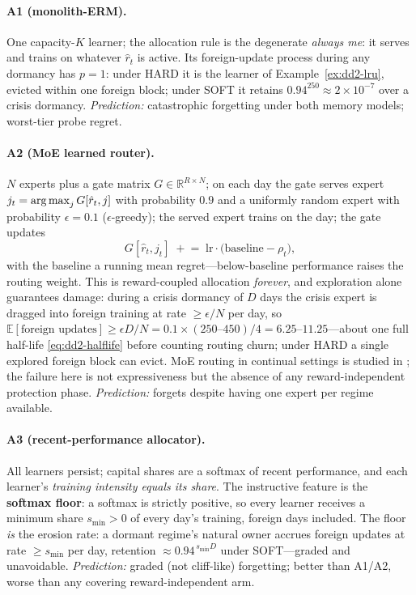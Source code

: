 \documentclass[11pt,a4paper]{article}
\theoremstyle{definition}
\theoremstyle{plain}
\newcommand{\R}{\mathbb{R}}
\newcommand{\E}{\mathbb{E}}
\newcommand{\argmax}{\operatornamewithlimits{arg\,max}}
\begin{document}
\paragraph{A1 (monolith-ERM).} One capacity-$K$ learner; the allocation rule
is the degenerate \emph{always me}: it serves and trains on whatever
$\hat r_t$ is active. Its foreign-update process during any dormancy has
$p = 1$: under HARD it is the learner of Example~\ref{ex:dd2-lru}, evicted
within one foreign block; under SOFT it retains
$0.94^{250} \approx 2 \times 10^{-7}$ over a crisis dormancy.
\emph{Prediction:} catastrophic forgetting under both memory models;
worst-tier probe regret.

\paragraph{A2 (MoE learned router).} $N$ experts plus a gate matrix
$G \in \R^{R \times N}$; on each day the gate serves expert
$j_t = \argmax_j G[\hat r_t, j]$ with probability $0.9$ and a uniformly
random expert with probability $\epsilon = 0.1$ ($\epsilon$-greedy); the
served expert trains on the day; the gate updates
\[
G[\hat r_t, j_t] \;\mathrel{+}=\; \mathrm{lr} \cdot
\bigl(\text{baseline} - \rho_{t}\bigr),
\]
with the baseline a running mean regret---below-baseline performance raises
the routing weight. This is reward-coupled allocation \emph{forever}, and
exploration alone guarantees damage: during a crisis dormancy of $D$ days
the crisis expert is dragged into foreign training at rate
$\ge \epsilon/N$ per day, so
$\E[\text{foreign updates}] \ge \epsilon D / N
= 0.1 \times (250\text{--}450)/4 = 6.25\text{--}11.25$---about one full
half-life \eqref{eq:dd2-halflife} before counting routing churn; under HARD
a single explored foreign block can evict. MoE routing in continual settings
is studied in \citet{li2024moecl}; the failure here is not expressiveness
but the absence of any reward-independent protection phase.
\emph{Prediction:} forgets despite having one expert per regime available.

\paragraph{A3 (recent-performance allocator).} All learners persist; capital
shares are a softmax of recent performance, and each learner's
\emph{training intensity equals its share}. The instructive feature is the
\textbf{softmax floor}: a softmax is strictly positive, so every learner
receives a minimum share $s_{\min} > 0$ of every day's training, foreign
days included. The floor \emph{is} the erosion rate: a dormant regime's
natural owner accrues foreign updates at rate $\ge s_{\min}$ per day,
retention $\approx 0.94^{\,s_{\min} D}$ under SOFT---graded and unavoidable.
\emph{Prediction:} graded (not cliff-like) forgetting; better than A1/A2,
worse than any covering reward-independent arm.
\end{document}
